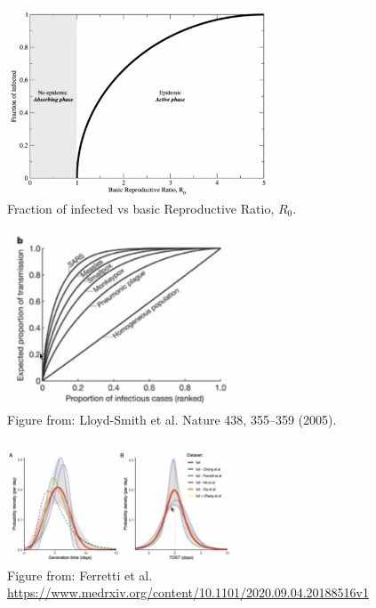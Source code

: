 \documentclass[../main/main.tex]{subfiles}
\begin{document}
\begin{figure}[h!]
\centering
\includegraphics[width=0.7\textwidth]{../lessons/image/02/2_R_0.png}
\caption{\label{fig:2_R_0.png} Fraction of infected vs basic Reproductive Ratio, \( R_0 \).}
\end{figure}

\begin{figure}[h!]
\centering
\includegraphics[width=0.6\textwidth]{../lessons/image/02/3_outbreaks.png}
\caption{\label{fig:3_outbreaks} Figure from: Lloyd-Smith et al. Nature 438, 355–359 (2005).}
\end{figure}

\begin{figure}[h!]
\centering
\includegraphics[width=0.6\textwidth]{../lessons/image/02/4_TOST.png}
\caption{\label{fig:4_TOST} Figure from: Ferretti et al. \url{https://www.medrxiv.org/content/10.1101/2020.09.04.20188516v1}}
\end{figure}
\end{document}
